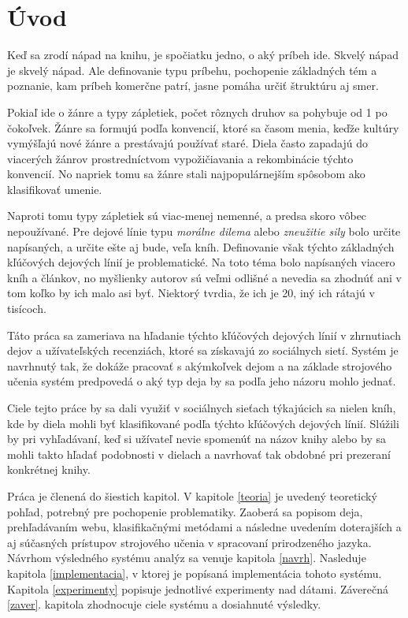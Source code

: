 
\chapter{Úvod}

Keď sa zrodí nápad na knihu, je spočiatku jedno, o aký príbeh ide. Skvelý nápad je skvelý nápad. Ale definovanie typu príbehu, pochopenie základných tém a poznanie, kam príbeh komerčne patrí, jasne pomáha určiť štruktúru aj smer.

Pokiaľ ide o žánre a typy zápletiek, počet rôznych druhov sa pohybuje od 1 po čokoľvek. Žánre sa formujú podľa konvencií, ktoré sa časom menia, keďže kultúry vymýšľajú nové žánre a prestávajú používať staré. Diela často zapadajú do viacerých žánrov prostredníctvom vypožičiavania a rekombinácie týchto konvencií. No napriek tomu sa žánre stali najpopulárnejším spôsobom ako klasifikovať umenie.

Naproti tomu typy zápletiek sú viac-menej nemenné, a predsa skoro vôbec nepoužívané. Pre dejové línie typu \textit{morálne dilema} alebo \textit{zneužitie sily} bolo určite napísaných, a určite ešte aj bude, veľa kníh. Definovanie však týchto základných kľúčových dejových línií je problematické. Na toto téma bolo napísaných viacero kníh a článkov, no myšlienky autorov sú veľmi odlišné a nevedia sa zhodnúť ani v tom koľko by ich malo asi byť. Niektorý tvrdia, že ich je 20, iný ich rátajú v tisícoch. 

Táto práca sa zameriava na hľadanie týchto kľúčových dejových línií v zhrnutiach dejov a užívateľských recenziách, ktoré sa získavajú zo sociálnych sietí. Systém je navrhnutý tak, že dokáže pracovať s akýmkoľvek dejom a na základe strojového učenia systém predpovedá o aký typ deja by sa podľa jeho názoru mohlo jednať.

Ciele tejto práce by sa dali využiť v sociálnych sieťach týkajúcich sa nielen kníh, kde by diela mohli byť klasifikované podľa týchto kľúčových dejových línií. Slúžili by pri vyhľadávaní, keď si užívateľ nevie spomenúť na názov knihy alebo by sa mohli takto hľadať podobnosti v dielach a navrhovať tak obdobné pri prezeraní konkrétnej knihy.

Práca je členená do šiestich kapitol. V kapitole \ref{teoria} je uvedený teoretický pohľad, potrebný pre pochopenie problematiky. Zaoberá sa popisom deja, prehľadávaním webu, klasifikačnými metódami a následne uvedením doterajších a aj súčasných prístupov strojového učenia v spracovaní prirodzeného jazyka. Návrhom výsledného systému analýz sa venuje kapitola \ref{navrh}. Nasleduje kapitola \ref{implementacia}, v ktorej je popísaná implementácia tohoto systému. Kapitola \ref{experimenty} popisuje jednotlivé experimenty nad dátami. Záverečná \ref{zaver}. kapitola zhodnocuje ciele systému a dosiahnuté výsledky.

